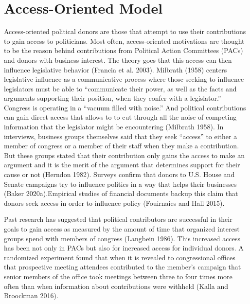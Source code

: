 \documentclass[12pt,]{article}
\begin{document}
\hypertarget{access-oriented-model}{%
\section{Access-Oriented Model}\label{access-oriented-model}}

Access-oriented political donors are those that attempt to use their
contributions to gain access to politicians. Most often, access-oriented
motivations are thought to be the reason behind contributions from
Political Action Committees (PACs) and donors with business interest.
The theory goes that this access can then influence legislative behavior
(Francia et al. 2003). Milbrath (1958) centers legislative influence as
a communicative process where those seeking to influence legislators
must be able to ``communicate their power, as well as the facts and
arguments supporting their position, when they confer with a
legislator.'' Congress is operating in a ``vacuum filled with noise.''
And political contributions can gain direct access that allows to to cut
through all the noise of competing information that the legislator might
be encountering (Milbrath 1958). In interviews, business groups
themselves said that they seek ``access'' to either a member of congress
or a member of their staff when they make a contribution. But these
groups stated that their contribution only gains the access to make an
argument and it is the merit of the argument that determines support for
their cause or not (Herndon 1982). Surveys confirm that donors to U.S.
House and Senate campaigns try to influence politics in a way that helps
their businesses (Baker 2020a).Empirical studies of financial documents
backup this claim that donors seek access in order to influence policy
(Fouirnaies and Hall 2015).

Past research has suggested that political contributors are successful
in their goals to gain access as measured by the amount of time that
organized interest groups spend with members of congress (Langbein
1986). This increased access has been not only in PACs but also for
increased access for individual donors. A randomized experiment found
that when it is revealed to congressional offices that prospective
meeting attendees contributed to the member's campaign that senior
members of the office took meetings between three to four times more
often than when information about contributions were withheld (Kalla and
Broockman 2016).
\end{document}
